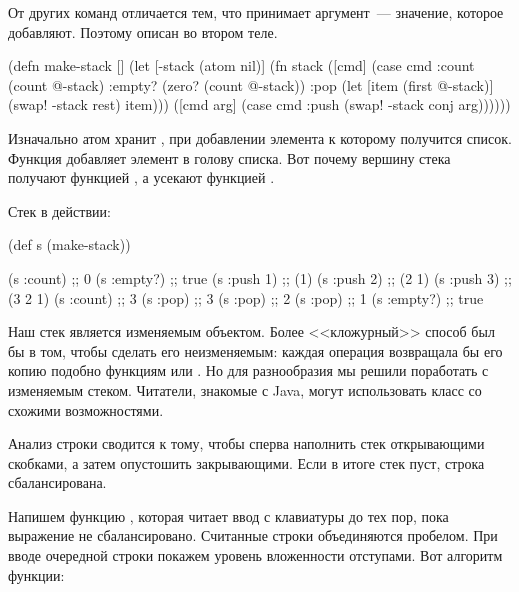 От других команд  отличается тем, что принимает аргумент~--- значение, которое добавляют. Поэтому  описан во втором теле.

\begin{english}
  \begin{clojure/lines}
(defn make-stack
  []
  (let [-stack
        (atom nil)]
    (fn stack
      ([cmd]
       (case cmd
         :count (count @-stack)
         :empty? (zero? (count @-stack))
         :pop (let [item (first @-stack)]
                (swap! -stack rest)
                item)))
      ([cmd arg]
       (case cmd
         :push
         (swap! -stack conj arg))))))
  \end{clojure/lines}
\end{english}

Изначально атом хранит , при добавлении элемента к которому получится список. Функция  добавляет элемент в голову списка. Вот почему вершину стека получают функцией , а усекают функцией  .

\pagebreaklarge

Стек в действии:

\begin{english}
  \begin{clojure}
(def s (make-stack))

(s :count)  ;; 0
(s :empty?) ;; true
(s :push 1) ;; (1)
(s :push 2) ;; (2 1)
(s :push 3) ;; (3 2 1)
(s :count)  ;; 3
(s :pop)    ;; 3
(s :pop)    ;; 2
(s :pop)    ;; 1
(s :empty?) ;; true
  \end{clojure}
\end{english}

Наш стек является изменяемым объектом. Более <<кложурный>> способ был бы в том, чтобы сделать его неизменяемым: каждая операция возвращала бы его копию подобно функциям  или . Но для разнообразия мы решили поработать с изменяемым стеком. Читатели, знакомые с Java, могут использовать класс  со схожими возможностями.

Анализ строки сводится к тому, чтобы сперва наполнить стек открывающими скобками, а затем опустошить закрывающими. Если в итоге стек пуст, строка сбалансирована.

Напишем функцию , которая читает ввод с клавиатуры до тех пор, пока выражение не сбалансировано. Считанные строки объединяются пробелом. При вводе очередной строки покажем уровень вложенности отступами. Вот алгоритм функции:

